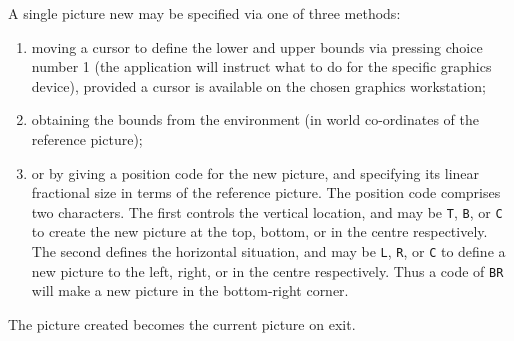 {{{      A single picture new may be specified via one of three methods:
      \begin{enumerate}
      \item moving a cursor to define the lower and upper bounds via
            pressing choice number 1 (the application will instruct what
            to do for the specific graphics device), provided a cursor
            is available on the chosen graphics workstation;
      \item obtaining the bounds from the environment (in world
            co-ordinates of the reference picture);
      \item or by giving a position code for the new picture, and
            specifying its linear fractional size in terms of the
            reference picture. The position code comprises two
            characters. The first controls the vertical location, and
            may be {\tt T}, {\tt B}, or {\tt C} to create the new picture
            at the top, bottom, or in the centre respectively. The second
            defines the horizontal situation, and may be {\tt L},
            {\tt R}, or {\tt C} to define a new picture to the left,
            right, or in the centre respectively. Thus a code of
            {\tt BR} will make a new picture in the bottom-right corner.
      \end{enumerate}

      The picture created becomes the current picture on exit.

}}}
